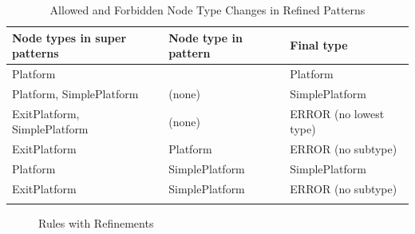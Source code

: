 \begin{longtable}[h!]{lll}
	\toprule
	Node types in super patterns
		& Node type in pattern
		& Final type \\
	\midrule
	Platform
		& \text{(none)}
		& Platform \\
	Platform, SimplePlatform
		& (none)
		& SimplePlatform \\
	ExitPlatform, SimplePlatform
		& (none)
		& ERROR (no lowest type) \\
	ExitPlatform
		& Platform
		& ERROR (no subtype) \\
	Platform
		& SimplePlatform
		& SimplePlatform \\
	ExitPlatform
		& SimplePlatform
		& ERROR (no subtype) \\
	\bottomrule
	\caption{Allowed and Forbidden Node Type Changes in Refined Patterns}
	\label{table:node-type-changes}
\end{longtable}

\begin{figure}[h!]
	\centering
	\caption{Rules with Refinements}
	\label{fig:examples-with-refinement}
\end{figure}

